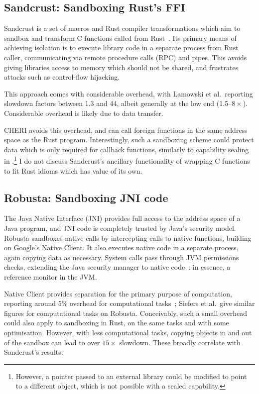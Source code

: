 \documentclass[dissertation.tex]{subfiles}
\begin{document}
\subsection{Sandcrust: Sandboxing Rust's FFI}
\label{sec:rel-sandcrust}

Sandcrust is a set of macros and Rust compiler transformations which aim
to sandbox and transform C functions called from
Rust~\cite{lamowski-sandcrust}.
Its primary means of achieving isolation is to execute library code in a
separate process from Rust caller, communicating via remote procedure
calls (RPC) and pipes.
This avoids giving libraries access to memory which should not be
shared, and frustrates attacks such as control-flow hijacking.

This approach comes with considerable overhead, with Lamowski et al.\
reporting slowdown factors between 1.3 and 44, albeit generally at the
low end (1.5--\(8\times\)).
Considerable overhead is likely due to data transfer.

CHERI avoids this overhead, and can call foreign functions in the same
address space as the Rust program.
Interestingly, such a sandboxing scheme could protect data which is only
required for callback functions, similarly to capability sealing in
\Cref{sec:eval-rust-xprocess}.\footnote{
    However, a pointer passed to an external library could be modified
    to point to a different object, which is not possible with a sealed
    capability.
}
I do not discuss Sandcrust's ancillary functionality of wrapping C
functions to fit Rust idioms which has value of its own.


\subsection{Robusta: Sandboxing JNI code}
The Java Native Interface (JNI) provides full access to the address
space of a Java program, and JNI code is completely trusted by Java's
security model.
Robusta sandboxes native calls by intercepting calls to native
functions, building on Google's Native Client.
It also executes native code in a separate process, again copying data
as necessary.
System calls pass through JVM permissions checks, extending the Java
security manager to native code~\cite{siefers-robusta}: in essence, a
reference monitor in the JVM.

Native Client provides separation for the primary purpose of
computation, reporting around 5\% overhead for computational
tasks~\cite{yee-nacl}; Siefers et al.\ give similar figures for
computational tasks on Robusta.
Conceivably, such a small overhead could also apply to sandboxing in
Rust, on the same tasks and with some optimisation.
However, with less computational tasks, copying objects in and out of
the sandbox can lead to over \(15\times\) slowdown.
These broadly correlate with Sandcrust's results.
\end{document}

